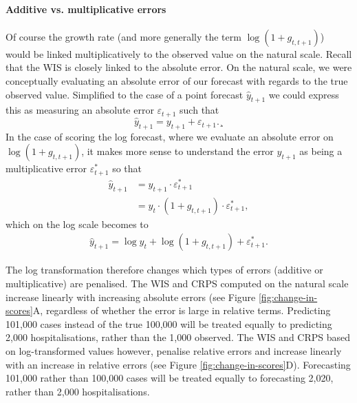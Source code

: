 \documentclass{article}
\begin{document}
\paragraph{Additive vs. multiplicative errors}
Of course the growth rate (and more generally the term $\log (1 + g_{t, t+1})$) would be linked multiplicatively to the observed value on the natural scale. Recall that the WIS is closely linked to the absolute error. On the natural scale, we were conceptually evaluating an absolute error of our forecast with regards to the true observed value. Simplified to the case of a point forecast $\hat{y}_{t+1}$ we could express this as measuring an absolute error $\varepsilon_{t+1}$ such that
%
\begin{equation}
    \hat{y}_{t+1} = y_{t+1} + \varepsilon_{t+1}. 
¸\end{equation}
In the case of scoring the log forecast, where we evaluate an absolute error on $\log (1 + g_{t, t+1})$, it makes more sense to understand the error $y_{t+1}$ as being a multiplicative error $\varepsilon^*_{t+1}$ so that
\begin{align}
    \hat{y}_{t+1} &= y_{t+1} \cdot \varepsilon^*_{t+1} \\
    &= y_{t} \cdot (1 + g_{t, t+1}) \cdot \varepsilon^*_{t+1},
\end{align}
%
which on the log scale becomes to 
\begin{align}
    \hat{y}_{t+1} = \log y_{t} + \log (1 + g_{t, t+1}) + \varepsilon^*_{t+1}. 
\end{align}

The log transformation therefore changes which types of errors (additive or multiplicative) are penalised. The WIS and CRPS computed on the natural scale increase linearly with increasing absolute errors (see Figure \ref{fig:change-in-scores}A, regardless of whether the error is large in relative terms. Predicting 101,000 cases instead of the true 100,000 will be treated equally to predicting 2,000 hospitalisations, rather than the 1,000 observed. The WIS and CRPS based on log-transformed values however, penalise relative errors and increase linearly with an increase in relative errors (see Figure \ref{fig:change-in-scores}D). Forecasting 101,000 rather than 100,000 cases will be treated equally to forecasting 2,020, rather than 2,000 hospitalisations. 
\end{document}
